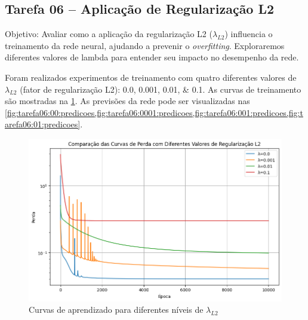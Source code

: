 \subsection{Tarefa 06 -- Aplicação de Regularização L2}

\begin{comandoquestao}
Objetivo: Avaliar como a aplicação da regularização L2 ($\lambda_{L2}$) 
influencia o 
treinamento da rede neural, ajudando a prevenir o \textit{overfitting}. 
Exploraremos 
diferentes valores de lambda para entender seu impacto no desempenho da rede.
\end{comandoquestao}

Foram realizados experimentos de treinamento com quatro diferentes valores de 
$\lambda_{L2}$ (fator de regularização L2): \numlist{0,0;0,001;0,01;0,1}. As 
curvas 
de treinamento são mostradas na \cref{fig:tarefas06:curvas}. As previsões da 
rede pode ser visualizadas nas 
\cref{fig:tarefa06:00:predicoes,fig:tarefa06:0001:predicoes,fig:tarefa06:001:predicoes,fig:tarefa06:01:predicoes}.


\begin{figure}[tbh]
	\centering
	\caption{Curvas de aprendizado para diferentes níveis de $\lambda_{L2}$}
	\label{fig:tarefas06:curvas}
	\includegraphics[width=0.7\linewidth]{./0803_imgs/0703_tarefa06/png-241113-093042368-16803966117590063962.png}
\end{figure}


